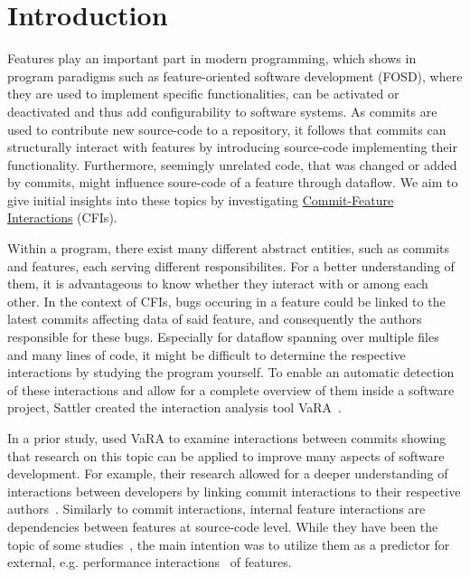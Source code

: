 \chapter{Introduction}\label{ch:introduction}

Features play an important part in modern programming, which shows in program paradigms such as feature-oriented software development (FOSD),
where they are used to implement specific functionalities, can be activated or deactivated and thus add configurability to software systems.
As commits are used to contribute new source-code to a repository, it follows that commits can structurally interact with features by introducing source-code implementing their functionality. 
Furthermore, seemingly unrelated code, that was changed or added by commits, might influence soure-code of a feature through dataflow.
We aim to give initial insights into these topics by investigating \hyperref[ch:example_chapter]{Commit-Feature Interactions} (CFIs).

Within a program, there exist many different abstract entities, such as commits and features, each serving different responsibilites.
For a better understanding of them, it is advantageous to know whether they interact with or among each other.
In the context of CFIs, bugs occuring in a feature could be linked to the latest commits affecting data of said feature, and consequently the authors responsible for these bugs.
Especially for dataflow spanning over multiple files and many lines of code, it might be difficult to determine the respective interactions by studying the program yourself.
To enable an automatic detection of these interactions and allow for a complete overview of them inside a software project, Sattler created the interaction analysis tool VaRA~\cite{VaRA2023}.

In a prior study, \citet{sattler2023seal} used VaRA to examine interactions between commits showing that research on this topic can be applied to improve many aspects of software development.
For example, their research allowed for a deeper understanding of interactions between developers by linking commit interactions to their respective authors~\cite{sattler2023seal}. 
Similarly to commit interactions, internal feature interactions are dependencies between features at source-code level. 
While they have been the topic of some studies~\cite{kolesnikov2017relation}, the main intention was to utilize them as a predictor for external, e.g. performance interactions~\cite{siegmund2012predicting} of features.

